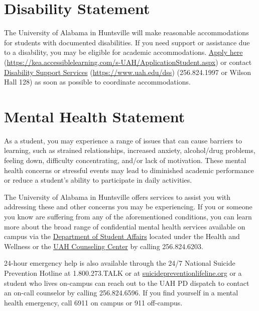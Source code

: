 \documentclass[11pt]{report}
\begin{document}
\chapter{Disability Statement}
The University of Alabama in Huntsville will make reasonable accommodations for students with documented disabilities. If you need support or assistance due to a disability, you may be eligible for academic accommodations. \href{https://kea.accessiblelearning.com/s-UAH/ApplicationStudent.aspx}{Apply here} (\url{https://kea.accessiblelearning.com/s-UAH/ApplicationStudent.aspx}) or contact \href{https://www.uah.edu/dss}{Disability Support Services} (\url{https://www.uah.edu/dss}) (256.824.1997 or Wilson Hall 128) as soon as possible to coordinate accommodations.

\chapter{Mental Health Statement}
As a student, you may experience a range of issues that can cause barriers to learning, such as strained relationships, increased anxiety, alcohol/drug problems, feeling down, difficulty concentrating, and/or lack of motivation. These mental health concerns or stressful events may lead to diminished academic performance or reduce a student's ability to participate in daily activities.

The University of Alabama in Huntsville offers services to assist you with addressing these and other concerns you may be experiencing. If you or someone you know are suffering from any of the aforementioned conditions, you can learn more about the broad range of confidential mental health services available on campus via the \href{https://www.uah.edu/dos}{Department of Student Affairs} located under the Health and Wellness or the \href{https://www.uah.edu/counseling-center}{UAH Counseling Center} by calling 256.824.6203.

24-hour emergency help is also available through the 24/7 National Suicide Prevention Hotline at 1.800.273.TALK or at \href{https://suicidepreventionlifeline.org/}{suicidepreventionlifeline.org} or a student who lives on-campus can reach out to the UAH PD dispatch to contact an on-call counselor by calling 256.824.6596. If you find yourself in a mental health emergency, call 6911 on campus or 911 off-campus.
\end{document}
